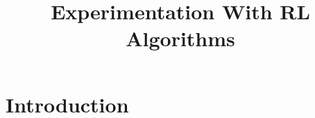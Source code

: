 \documentclass[11pt]{article} %
\title{Experimentation With RL Algorithms}
\author{}
\date{}
\begin{document}
\maketitle

\tableofcontents

\newpage

\section{Introduction}

\newpage


\end{document}
